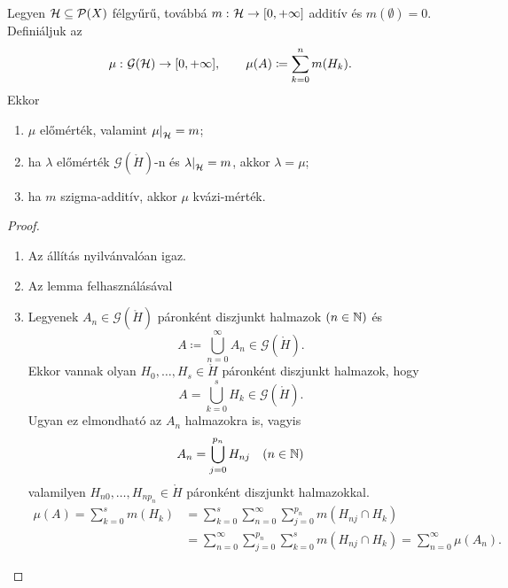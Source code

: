 \documentclass[
]{elteikthesis}[2024/04/26]
\begin{document}
	\newpage
	\begin{theorem}{}{}
		Legyen \( \mathcal{H} \subseteq \mathcal{P}( X ) \) félgyűrű, 
		továbbá \( m \,\colon \mathcal{H} \to [0, +\infty] \) additív és \( m(\emptyset) = 0 \).
		Definiáljuk az 
		\[
			\mu \,\colon \mathcal{G}(\mathcal{H}) \to [0, +\infty], \qquad
			\mu(A) \coloneq \sum_{k=0}^{n} m( H_k ).
		\]
		Ekkor
		\begin{enumerate}
			\item \( \mu \) előmérték, valamint \( \restr{\mu}{\ring{H}} = m \);
			
			\item ha \( \lambda \) előmérték \( \mathcal{G}(\ring{H}) \)-n
			és \( \restr{\lambda}{\ring{H}} = m \), akkor \( \lambda = \mu \);
			
			\item ha \( m \) szigma-additív, akkor \( \mu \) kvázi-mérték.
		\end{enumerate}
	\end{theorem}
	\begin{proof}\,
		\begin{enumerate}
			\item Az állítás nyilvánvalóan igaz.
			
			\item Az lemma felhasználásával 
			
			\item Legyenek \( A_n \in \mathcal{G}(\ring{H}) \) páronként diszjunkt halmazok 
			\( (n \in \mathbb{N}) \) és
			\[
				A \coloneq \bigcup_{n=0}^{\infty} A_n \in \mathcal{G}(\ring{H}).
			\]
			Ekkor vannak olyan \( H_0, \dots, H_s \in \ring{H} \) páronként diszjunkt halmazok, hogy
			\[
				A = \bigcup_{k=0}^{s} H_k \in \mathcal{G}(\ring{H}).
			\]
			Ugyan ez elmondható az \( A_n \) halmazokra is, vagyis
			\[
				A_n = \bigcup_{j=0}^{p_n} H_{nj} \quad (n \in \mathbb{N})
			\]
			valamilyen \( H_{n0}, \dots, H_{np_n} \in \ring{H} \) páronként diszjunkt halmazokkal.
			\begin{align*}
				\mu(A)
				 = \sum_{k=0}^{s} m( H_k )
				&= \sum_{k=0}^{s} \sum_{n=0}^{\infty} \sum_{j=0}^{p_n} m( H_{nj} \cap H_k ) \\
				&= \sum_{n=0}^{\infty} \sum_{j=0}^{p_n} \sum_{k=0}^{s} m( H_{nj} \cap H_k ) 
				 = \sum_{n=0}^{\infty} \mu( A_n ).
			\end{align*}
		\end{enumerate}
	\end{proof}
	
\end{document}
